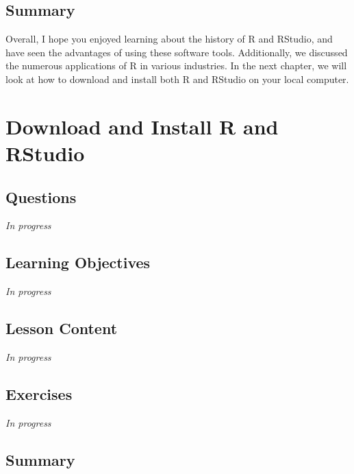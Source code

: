 \documentclass[
  letterpaper,
  DIV=11,
  numbers=noendperiod]{scrreprt}
\begin{document}
\hypertarget{summary-1}{%
\section{Summary}\label{summary-1}}

Overall, I hope you enjoyed learning about the history of R and RStudio,
and have seen the advantages of using these software tools.
Additionally, we discussed the numerous applications of R in various
industries. In the next chapter, we will look at how to download and
install both R and RStudio on your local computer.


\hypertarget{sec-download-install}{%
\chapter{Download and Install R and
RStudio}\label{sec-download-install}}

\hypertarget{questions-1}{%
\section{Questions}\label{questions-1}}

\emph{In progress}

\hypertarget{learning-objectives-1}{%
\section{Learning Objectives}\label{learning-objectives-1}}

\emph{In progress}

\hypertarget{lesson-content-1}{%
\section{Lesson Content}\label{lesson-content-1}}

\emph{In progress}

\hypertarget{exercises-1}{%
\section{Exercises}\label{exercises-1}}

\emph{In progress}

\hypertarget{summary-2}{%
\section{Summary}\label{summary-2}}
\end{document}
